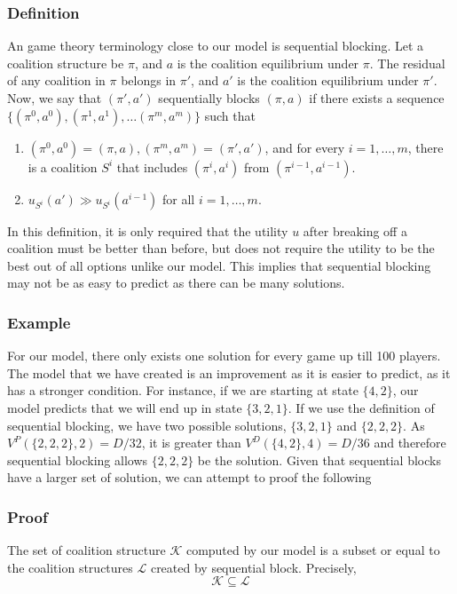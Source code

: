 \documentclass[sigconf,anonymous]{aamas}
\begin{document}
\subsubsection{Definition}
An game theory terminology close to our model is sequential blocking. Let a coalition structure be $\pi$, and $a$ is the coalition equilibrium under $\pi$. The residual of any coalition in $\pi$ belongs in $\pi'$, and $a'$ is the coalition equilibrium under $\pi'$. Now, we say that $(\pi', a')$ sequentially blocks $(\pi, a)$ if there exists a sequence $\{(\pi^0, a^0), (\pi^1, a^1), \dots (\pi^m, a^m)\}$ such that 
\begin{enumerate}
	\item $(\pi^0, a^0) = (\pi, a), (\pi^m, a^m) = (\pi', a')$, and for every $i = 1, \dots, m$, there is a coalition $S^i$ that includes $(\pi^i, a^i)$ from $(\pi^{i-1}, a^{i-1})$. 
	\item $u_{S^i}(a')\gg u_{S^i}(a^{i-1})$ for all $i = 1, \dots, m$. 
\end{enumerate}
In this definition, it is only required that the utility $u$ after breaking off a coalition must be better than before, but does not require the utility to be the best out of all options unlike our model. This implies that sequential blocking may not be as easy to predict as there can be many solutions. 

\subsubsection{Example}
For our model, there only exists one solution for every game up till 100 players. The model that we have created is an improvement as it is easier to predict, as it has a stronger condition. For instance, if we are starting at state $\{4, 2\}$, our model predicts that we will end up in state $\{3, 2, 1\}$. If we use the definition of sequential blocking, we have two possible solutions, $\{3, 2, 1\}$ and $\{2, 2, 2\}$. As $V^P(\{2, 2, 2\}, 2) = D/32$, it is greater than $V^D(\{4, 2\}, 4) = D/36$ and therefore sequential blocking allows $\{2, 2, 2\}$ be the solution. Given that sequential blocks have a larger set of solution, we can attempt to proof the following 

\subsubsection{Proof} The set of coalition structure $\mathcal{K}$ computed by our model is a subset or equal to the coalition structures $\mathcal{L}$ created by sequential block. Precisely, 
\[\mathcal{K} \subseteq \mathcal{L}\]
\end{document}
